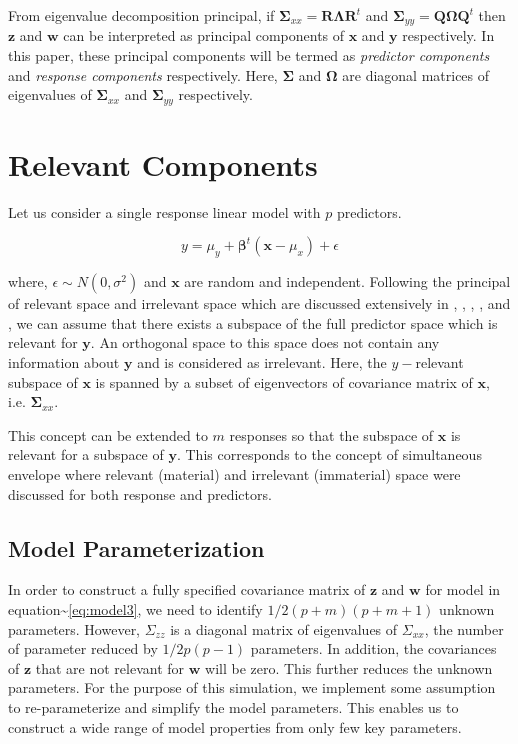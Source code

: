 \documentclass[12pt,A4paper,authoryear]{elsarticle} %
\theoremstyle{definition}
\theoremstyle{definition}
\theoremstyle{remark}
\begin{document}
From eigenvalue decomposition principal, if
\(\boldsymbol{\Sigma}_{xx} = \mathbf{R}\boldsymbol{\Lambda}\mathbf{R}^t\)
and
\(\boldsymbol{\Sigma}_{yy} = \mathbf{Q}\boldsymbol{\Omega}\mathbf{Q}^t\)
then \(\mathbf{z}\) and \(\mathbf{w}\) can be interpreted as principal
components of \(\mathbf{x}\) and \(\mathbf{y}\) respectively. In this
paper, these principal components will be termed as \emph{predictor
components} and \emph{response components} respectively. Here,
\(\boldsymbol{\Sigma}\) and \(\boldsymbol{\Omega}\) are diagonal
matrices of eigenvalues of \(\boldsymbol{\Sigma}_{xx}\) and
\(\boldsymbol{\Sigma}_{yy}\) respectively.

\section{Relevant Components}\label{relevant-components}

Let us consider a single response linear model with \(p\) predictors.

\[y = \mu_y + \boldsymbol{\beta}^t\left(\mathbf{x} - \mu_x\right) + \epsilon\]

where, \(\epsilon \sim N(0, \sigma^2)\) and \(\mathbf{x}\) are random
and independent. Following the principal of relevant space and
irrelevant space which are discussed extensively in
\citet{helland1994comparison}, \citet{Helland_2000},
\citet{helland2012near}, \citet{cook2013envelopes},
\citet{saebo2015simrel} and \citet{helland2017}, we can assume that
there exists a subspace of the full predictor space which is relevant
for \(\mathbf{y}\). An orthogonal space to this space does not contain
any information about \(\mathbf{y}\) and is considered as irrelevant.
Here, the \(y-\)relevant subspace of \(\mathbf{x}\) is spanned by a
subset of eigenvectors of covariance matrix of \(\mathbf{x}\), i.e.
\(\boldsymbol{\Sigma}_{xx}\).

This concept can be extended to \(m\) responses so that the subspace of
\(\mathbf{x}\) is relevant for a subspace of \(\mathbf{y}\). This
corresponds to the concept of simultaneous envelope
\citep{cook2015simultaneous} where relevant (material) and irrelevant
(immaterial) space were discussed for both response and predictors.

\subsection{Model Parameterization}\label{model-parameterization}

In order to construct a fully specified covariance matrix of
\(\mathbf{z}\) and \(\mathbf{w}\) for model in
equation\textasciitilde{}\eqref{eq:model3}, we need to identify
\(1/2 (p+m)(p+m+1)\) unknown parameters. However, \(\Sigma_{zz}\) is a
diagonal matrix of eigenvalues of \(\Sigma_{xx}\), the number of
parameter reduced by \(1/2p(p-1)\) parameters. In addition, the
covariances of \(\mathbf{z}\) that are not relevant for \(\mathbf{w}\)
will be zero. This further reduces the unknown parameters. For the
purpose of this simulation, we implement some assumption to
re-parameterize and simplify the model parameters. This enables us to
construct a wide range of model properties from only few key parameters.
\end{document}
